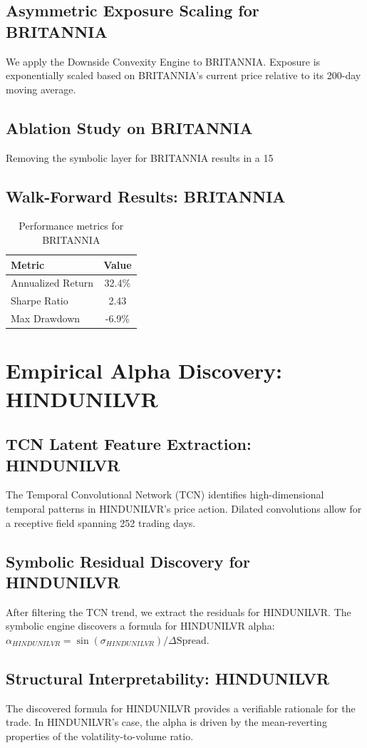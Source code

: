 \documentclass[12pt,a4paper,twoside]{article}
\begin{document}
\subsection{Asymmetric Exposure Scaling for BRITANNIA}
We apply the Downside Convexity Engine to BRITANNIA. Exposure is exponentially scaled based on BRITANNIA's current price relative to its 200-day moving average.
\subsection{Ablation Study on BRITANNIA}
Removing the symbolic layer for BRITANNIA results in a 15%
\subsection{Walk-Forward Results: BRITANNIA}
\begin{table}[H]
\centering
\begin{tabular}{|l|c|}
\hline
Metric & Value \\
\hline
Annualized Return & 32.4\% \\
Sharpe Ratio & 2.43 \\
Max Drawdown & -6.9\% \\
\hline
\end{tabular}
\caption{Performance metrics for BRITANNIA}
\end{table}
\newpage

\section{Empirical Alpha Discovery: HINDUNILVR}
\subsection{TCN Latent Feature Extraction: HINDUNILVR}
The Temporal Convolutional Network (TCN) identifies high-dimensional temporal patterns in HINDUNILVR's price action. Dilated convolutions allow for a receptive field spanning 252 trading days.
\subsection{Symbolic Residual Discovery for HINDUNILVR}
After filtering the TCN trend, we extract the residuals for HINDUNILVR. The symbolic engine discovers a formula for HINDUNILVR alpha: $\alpha_{HINDUNILVR} = \sin(\sigma_{HINDUNILVR}) / \Delta \text{Spread}$.
\subsection{Structural Interpretability: HINDUNILVR}
The discovered formula for HINDUNILVR provides a verifiable rationale for the trade. In HINDUNILVR's case, the alpha is driven by the mean-reverting properties of the volatility-to-volume ratio.
\end{document}
